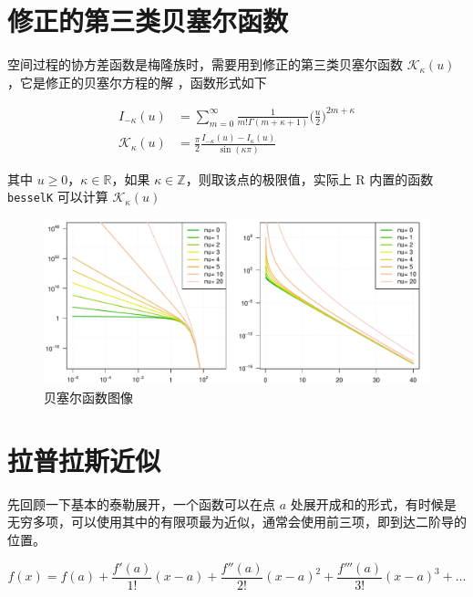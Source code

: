 \documentclass[12pt,a4paper,UTF8,twoside]{book}
\theoremstyle{definition}
\theoremstyle{definition}
\theoremstyle{definition}
\theoremstyle{remark}
\begin{document}
\hypertarget{Modified-Bessel-functions}{%
\section{修正的第三类贝塞尔函数}\label{Modified-Bessel-functions}}

空间过程的协方差函数是梅隆族时，需要用到修正的第三类贝塞尔函数
\(\mathcal{K}_{\kappa}(u)\)，它是修正的贝塞尔方程的解
\citep{Abramowitz1972}，函数形式如下

\begin{equation}
\begin{aligned}
I_{-\kappa}(u) & =  \sum_{m=0}^{\infty} \frac{1}{m!\Gamma(m + \kappa + 1)} \big(\frac{u}{2}\big)^{2m + \kappa} \\
\mathcal{K}_{\kappa}(u) & = \frac{\pi}{2} \frac{I_{-\kappa}(u) - I_{\kappa}(u)}{\sin (\kappa \pi)}
\end{aligned} \label{eq:besselK-function}
\end{equation}

其中 \(u \geq 0\)，\(\kappa \in \mathbb{R}\)，如果
\(\kappa \in \mathbb{Z}\)，则取该点的极限值，实际上 R 内置的函数
\texttt{besselK} 可以计算 \(\mathcal{K}_{\kappa}(u)\)
\citep{Campbell1980}

\begin{figure}

{\centering \includegraphics[width=0.7\linewidth]{figures/bessel} 

}

\caption{贝塞尔函数图像}\label{fig:Bessel-function}
\end{figure}

\hypertarget{Laplace-approximation}{%
\section{拉普拉斯近似}\label{Laplace-approximation}}

先回顾一下基本的泰勒展开，一个函数可以在点 \(a\)
处展开成和的形式，有时候是无穷多项，可以使用其中的有限项最为近似，通常会使用前三项，即到达二阶导的位置。

\[
f(x) = f(a) + \frac{f'(a)}{1!}(x-a) + \frac{f''(a)}{2!}(x-a)^2 + \frac{f'''(a)}{3!}(x-a)^3 + \ldots
\]
\end{document}
